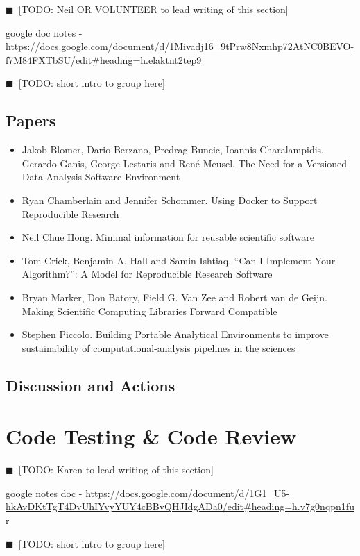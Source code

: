 \documentclass[11pt, oneside]{amsart}
\newcommand{\todo}[1]{{\color{blue}$\blacksquare$~\textsf{[TODO: #1]}}}
\begin{document}
\todo{Neil OR VOLUNTEER to lead writing of this section}

google doc notes - \url{https://docs.google.com/document/d/1Mivadj16_9tPrw8Nxmhp72AtNC0BEVO-f7M84FXTbSU/edit#heading=h.elaktnt2tep9}

\todo{short intro to group here}

\subsection{Papers}

\begin{itemize}
\item Jakob Blomer, Dario Berzano, Predrag Buncic, Ioannis Charalampidis, Gerardo Ganis, George Lestaris and Ren\'{e} Meusel. The Need for a Versioned Data Analysis Software Environment~\cite{wssspe2_blomer}
\item Ryan Chamberlain and Jennifer Schommer. Using {Docker} to Support Reproducible Research~\cite{wssspe2_chamberlain}
\item Neil Chue Hong. Minimal information for reusable scientific software~\cite{wssspe2_chue_hong}
\item Tom Crick, Benjamin A. Hall and Samin Ishtiaq. ``Can I Implement Your Algorithm?'': A Model for Reproducible Research Software~\cite{wssspe2_crick}
\item Bryan Marker, Don Batory, Field G. Van Zee and Robert van de Geijn. Making Scientific Computing Libraries Forward Compatible~\cite{wssspe2_marker}
\item Stephen Piccolo. Building Portable Analytical Environments to improve sustainability of computational-analysis pipelines in the sciences~\cite{wssspe2_piccolo}
\end{itemize}

\subsection{Discussion and Actions}

\section{Code Testing \& Code Review}

\todo{Karen to lead writing of this section}

google notes doc - 
\url{https://docs.google.com/document/d/1G1_U5-hkAvDKtTgT4DvUhIYvyYUY4cBBvQHJIdgADa0/edit#heading=h.v7g0nqpn1fur}

\todo{short intro to group here}
\end{document}
